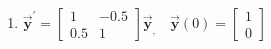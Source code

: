\begin{enumerate}
\begin{enumerate}[label=\arabic*.]
    \begin{subanswer}
    \end{subanswer}
    \item $\overrightarrow{\boldsymbol{y}}^{\prime}=\left[\begin{array}{rr}1 & -0.5 \\ 0.5 & 1\end{array}\right] \overrightarrow{\boldsymbol{y}}_{,} \quad \overrightarrow{\boldsymbol{y}}(0)=\left[\begin{array}{l}1 \\ 0\end{array}\right]$\\
    \begin{subanswer}
    \end{subanswer}
  \end{enumerate}


  \newpage


\end{enumerate}
